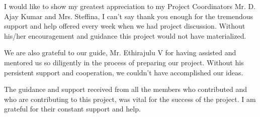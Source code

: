 \documentclass[BTech]{srmuthesis}
\begin{document}
I would like to show my greatest appreciation to my {Project Coordinators Mr. D. Ajay Kumar and Mrs. Steffina}, I can't say thank you enough for the tremendous support and help offered every week when we had project discussion. Without his/her encouragement and guidance this project would not have materialized.

We are also grateful to our {guide, Mr. Ethirajulu V} for having assisted and mentored us so diligently in the process of preparing our project. Without his persistent support and cooperation, we couldn't have accomplished our ideas.

The guidance and support received from all the members who contributed and who are contributing to this project, was vital for the success of the project. I am grateful for their constant support and help.\\

\begin{singlespace}
\tableofcontents
\thispagestyle{empty}

\listoftables
{}
\listoffigures
{}
\end{singlespace}


\abbreviations
\begin{acronym}

\end{acronym}

\end{document}
